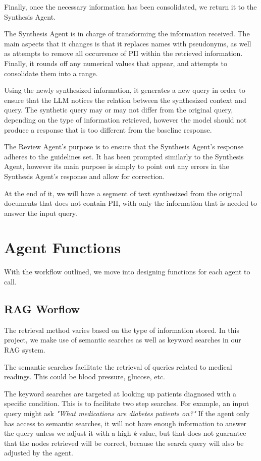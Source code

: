 Finally, once the necessary information has been consolidated, we return it to the Synthesis Agent.

The Synthesis Agent is in charge of transforming the information received. The main aspects that it changes is that it replaces names with pseudonyms, as well as attempts to remove all occurrence of PII within the retrieved information. Finally, it rounds off any numerical values that appear, and attempts to consolidate them into a range.

Using the newly synthesized information, it generates a new query in order to ensure that the LLM notices the relation between the synthesized context and query. The synthetic query may or may not differ from the original query, depending on the type of information retrieved, however the model should not produce a response that is too different from the baseline response.

The Review Agent's purpose is to ensure that the Synthesis Agent's response adheres to the guidelines set. It has been prompted similarly to the Synthesis Agent, however its main purpose is simply to point out any errors in the Synthesis Agent's response and allow for correction.

At the end of it, we will have a segment of text synthesized from the original documents that does not contain PII, with only the information that is needed to answer the input query.
\section{Agent Functions}

With the workflow outlined, we move into designing functions for each agent to call.

\subsection{RAG Worflow}


The retrieval method varies based on the type of information stored. In this project, we make use of semantic searches as well as keyword searches in our RAG system.

The semantic searches facilitate the retrieval of queries related to medical readings. This could be blood pressure, glucose, etc.

The keyword searches are targeted at looking up patients diagnosed with a specific condition. This is to facilitate two step searches. For example, an input query might ask \textit{"What medications are diabetes patients on?"}
If the agent only has access to semantic searches, it will not have enough information to answer the query unless we adjust it with a high \textit{k} value, but that does not guarantee that the nodes retrieved will be correct, because the search query will also be adjusted by the agent.

